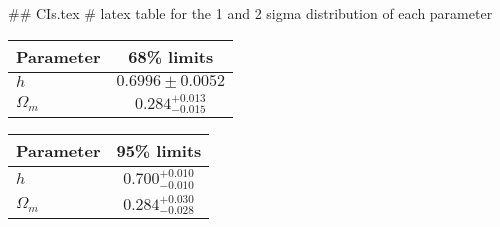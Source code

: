 ## CIs.tex
# latex table for the 1 and 2 sigma distribution of each parameter

\begin{tabular} { l  c}
 Parameter &  68\% limits\\
\hline
{\boldmath$h              $} & $0.6996\pm 0.0052          $\\
{\boldmath$\Omega_m       $} & $0.284^{+0.013}_{-0.015}   $\\
\hline
\end{tabular}

\begin{tabular} { l  c}
 Parameter &  95\% limits\\
\hline
{\boldmath$h              $} & $0.700^{+0.010}_{-0.010}   $\\
{\boldmath$\Omega_m       $} & $0.284^{+0.030}_{-0.028}   $\\
\hline
\end{tabular}
